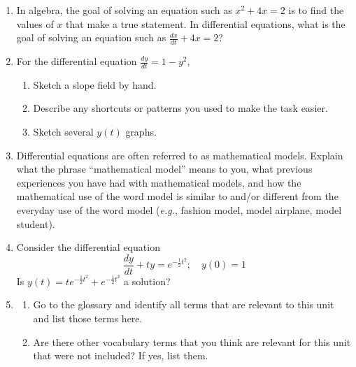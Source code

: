 \begin{enumerate}
\item In algebra, the goal of solving an equation such as $x^2 + 4x =2$ is to find the values of $x$ that make a true statement. In differential equations, what is the goal of solving an equation such as $\displaystyle\frac{dx}{dt}+4x=2$? 

\item  For the differential equation   $\displaystyle \frac{dy}{dt}=1-y^2$,
\begin{enumerate}
\item	Sketch a slope field by hand. 
\item	Describe any shortcuts or patterns you used to make the task easier.
\item	Sketch several $y(t)$ graphs.
\end{enumerate}

\item Differential equations are often referred to as mathematical models. Explain what the phrase ``mathematical model'' means to you, what previous experiences you have had with mathematical models, and how the mathematical use of the word model is similar to and/or different from the everyday use of the word model ({\em e.g.}, fashion model, model airplane, model student).

\item Consider the differential equation
\[
\frac{dy}{dt}+ty=e^{-\frac{1}{2}t^2}; \quad y(0)=1
\]
Is $y(t)=te^{-\frac{1}{2}t^2}+e^{-\frac{1}{2}t^2}$ a solution?

\item
\begin{enumerate}
\item Go to the glossary and identify all terms that are relevant to this unit and list those terms here.
\item Are there other vocabulary terms that you think are relevant for this unit that were not included? If yes, list them.
\end{enumerate}



\end{enumerate}

